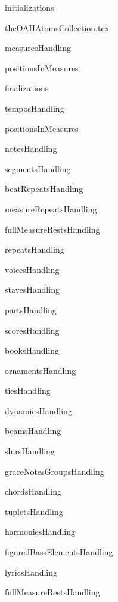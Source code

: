 \documentclass[11pt,a4paper]{report}
\begin{document}

{initializations}



{theOAHAtomsCollection.tex}



{measuresHandling}

{positionsInMeasures}

{finalizations}

{temposHandling}

{positionsInMeasures}

{notesHandling}

{segmentsHandling}

{beatRepeatsHandling}

{measureRepeatsHandling}

{fullMeasureRestsHandling}

{repeatsHandling}

{voicesHandling}

{stavesHandling}

{partsHandling}

{scoresHandling}

{booksHandling}

{ornamentsHandling}

{tiesHandling}

{dynamicsHandling}

{beamsHandling}

{slursHandling}

{graceNotesGroupsHandling}

{chordsHandling}

{tupletsHandling}

{harmoniesHandling}

{figuredBassElementsHandling}

{lyricsHandling}

{fullMeasureRestsHandling}
\end{document}
